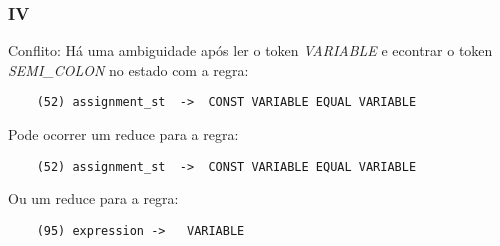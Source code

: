 \documentclass[a4paper,10pt]{article}
\begin{document}
    \subsubsection{IV}
    Conflito: H\'a uma ambiguidade ap\'os ler o token \emph{VARIABLE} e econtrar o token \emph{SEMI\_COLON} no estado com a regra:
    \begin{lstlisting}
    (52) assignment_st	->	CONST VARIABLE EQUAL VARIABLE
    \end{lstlisting}
    Pode ocorrer um reduce para a regra:
    \begin{lstlisting}
    (52) assignment_st	->	CONST VARIABLE EQUAL VARIABLE
    \end{lstlisting}
    Ou um reduce para a regra:
    \begin{lstlisting}
    (95) expression	->	 VARIABLE
    \end{lstlisting}
    \vspace{5mm}
\end{document}
